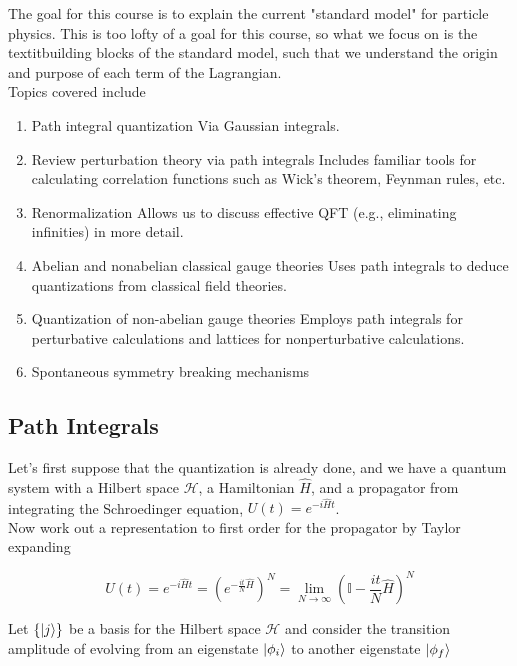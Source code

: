\noindent The goal for this course is to explain the current "standard model" for particle physics. This is too lofty of a goal for this course, so what we focus on is the textit{building blocks} of the standard model, such that we understand the origin and purpose of each term of the Lagrangian. \\

\noindent Topics covered include

\begin{enumerate}
\item Path integral quantization
	\subitem Via Gaussian integrals.
\item Review perturbation theory via path integrals
	\subitem Includes familiar tools for calculating correlation functions such as Wick's theorem, Feynman rules, etc.
\item Renormalization
	\subitem Allows us to discuss effective QFT (e.g., eliminating infinities) in more detail.
\item Abelian and nonabelian classical gauge theories
	\subitem Uses path integrals to deduce quantizations from classical field theories.
\item Quantization of non-abelian gauge theories
	\subitem Employs path integrals for perturbative calculations and lattices for nonperturbative calculations.
\item Spontaneous symmetry breaking mechanisms
\end{enumerate}

\subsection*{Path Integrals}

\noindent Let's first suppose that the quantization is already done, and we have a quantum system with a Hilbert space $\mathcal{H}$, a Hamiltonian $\hat{H}$, and a propagator from integrating the Schroedinger equation, $U(t) = e^{-i\hat{H}t}$. \\

\noindent Now work out a representation to first order for the propagator by Taylor expanding

\begin{equation}
U(t) = e^{-i\hat{H}t} = \left( e^{-\frac{it}{N}\hat{H}}  \right) ^N= \lim_{N \rightarrow \infty} \left( \mathbb{I} - \frac{it}{N}\hat{H} \right) ^N
\end{equation}

\noindent Let $\{ \ket{j} \}$ be a basis for the Hilbert space $\mathcal{H}$ and consider the transition amplitude of evolving from an eigenstate $\ket{\phi_i}$ to another eigenstate $\ket{\phi_f}$

